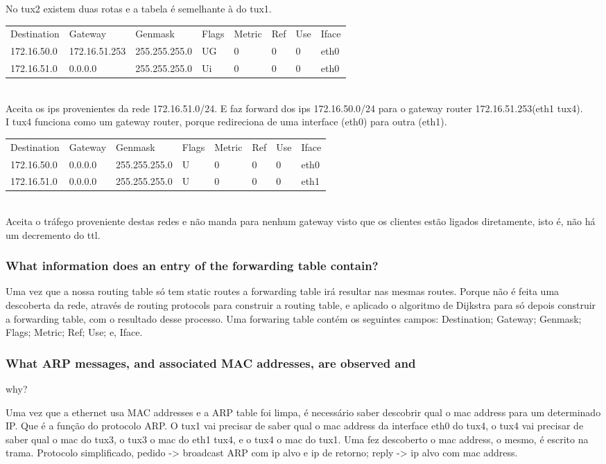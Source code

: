 \documentclass[a4paper]{article}
\begin{document}
\noindent No tux2 existem duas rotas e a tabela é semelhante à do tux1.\\
\begin{tabular}{l l l l l l l l}
Destination & Gateway & Genmask & Flags & Metric & Ref & Use & Iface \\
172.16.50.0 & 172.16.51.253 & 255.255.255.0 & UG & 0 & 0 & 0 & eth0 \\
172.16.51.0 & 0.0.0.0 & 255.255.255.0 & Ui & 0 & 0 & 0 & eth0
\end{tabular}\\
Aceita os ips provenientes da rede 172.16.51.0/24. E faz forward dos ips 172.16.50.0/24 para o gateway router 172.16.51.253(eth1 tux4).\\

\noindent I tux4 funciona como um gateway router, porque redireciona de uma interface (eth0) para outra (eth1).\\
\begin{tabular}{l l l l l l l l}
Destination & Gateway & Genmask & Flags & Metric & Ref & Use & Iface \\
172.16.50.0 & 0.0.0.0 & 255.255.255.0 & U & 0 & 0 & 0 & eth0 \\
172.16.51.0 & 0.0.0.0 & 255.255.255.0 & U & 0 & 0 & 0 & eth1
\end{tabular}\\
Aceita o tráfego proveniente destas redes e não manda para nenhum gateway visto que os clientes estão ligados diretamente, isto é, não há um decremento do ttl.

\subsubsection{What information does an entry of the forwarding table contain?}
Uma vez que a nossa routing table só tem static routes a forwarding table irá resultar nas mesmas routes. Porque não é feita uma descoberta da rede, através de routing protocols para construir a routing table, e aplicado o algoritmo de Dijkstra para só depois construir a forwarding table, com o resultado desse processo. Uma forwaring table contém os seguintes campos: Destination; Gateway; Genmask; Flags; Metric; Ref; Use; e, Iface.

\subsubsection{What ARP messages, and associated MAC addresses, are observed and}
why?

Uma vez que a ethernet usa MAC addresses e a ARP table foi limpa, é necessário saber descobrir qual o mac address para um determinado IP. Que é a função do protocolo ARP. O tux1 vai precisar de saber qual o mac address da interface eth0 do tux4, o tux4 vai precisar de saber qual o mac do tux3, o tux3 o mac do eth1 tux4, e o tux4 o mac do tux1. Uma fez descoberto o mac address, o mesmo, é escrito na trama. Protocolo simplificado, pedido -> broadcast ARP com ip alvo e ip de retorno; reply -> ip alvo com mac address.\\\newline
\end{document}
